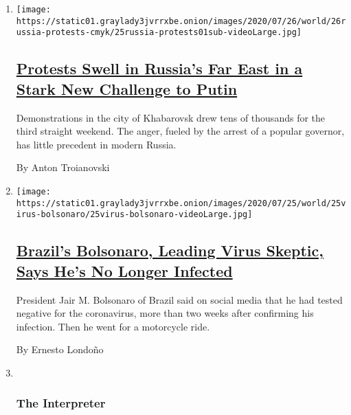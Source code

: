 \begin{enumerate}
\def\labelenumi{\arabic{enumi}.}
\item
  \texttt{[image: https://static01.graylady3jvrrxbe.onion/images/2020/07/26/world/26russia-protests-cmyk/25russia-protests01sub-videoLarge.jpg]}

  \hypertarget{protests-swell-in-russias-far-east-in-a-stark-new-challenge-to-putin}{%
  \subsection{\texorpdfstring{\href{/2020/07/25/world/europe/russia-protests-putin-khabarovsk.html}{Protests
  Swell in Russia's Far East in a Stark New Challenge to
  Putin}}{Protests Swell in Russia's Far East in a Stark New Challenge to Putin}}\label{protests-swell-in-russias-far-east-in-a-stark-new-challenge-to-putin}}

  Demonstrations in the city of Khabarovsk drew tens of thousands for
  the third straight weekend. The anger, fueled by the arrest of a
  popular governor, has little precedent in modern Russia.

  By Anton Troianovski
\item
  \texttt{[image: https://static01.graylady3jvrrxbe.onion/images/2020/07/25/world/25virus-bolsonaro/25virus-bolsonaro-videoLarge.jpg]}

  \hypertarget{brazils-bolsonaro-leading-virus-skeptic-says-hes-no-longer-infected}{%
  \subsection{\texorpdfstring{\href{/2020/07/25/world/americas/bolsonaro-coronavirus.html}{Brazil's
  Bolsonaro, Leading Virus Skeptic, Says He's No Longer
  Infected}}{Brazil's Bolsonaro, Leading Virus Skeptic, Says He's No Longer Infected}}\label{brazils-bolsonaro-leading-virus-skeptic-says-hes-no-longer-infected}}

  President Jair M. Bolsonaro of Brazil said on social media that he had
  tested negative for the coronavirus, more than two weeks after
  confirming his infection. Then he went for a motorcycle ride.

  By Ernesto Londoño
\item ~
  \hypertarget{the-interpreter}{%
  \subsubsection{The Interpreter}\label{the-interpreter}}


\end{enumerate}
